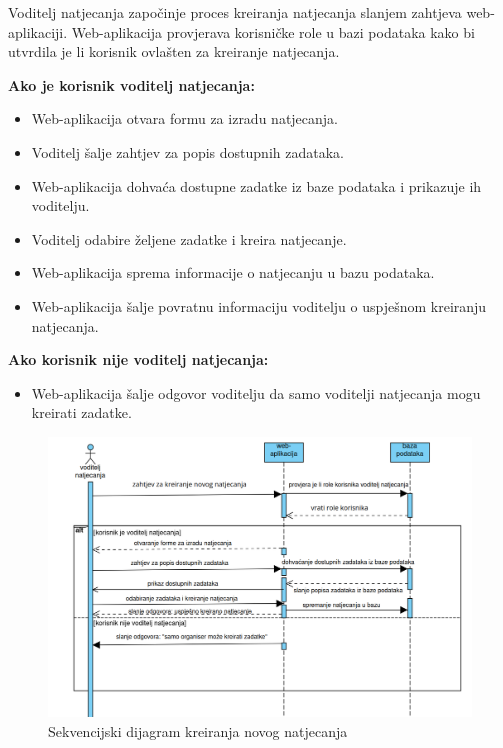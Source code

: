 \documentclass{article}
\begin{document}
Voditelj natjecanja započinje proces kreiranja natjecanja slanjem zahtjeva web-aplikaciji.
Web-aplikacija provjerava korisničke role u bazi podataka kako bi utvrdila je li korisnik ovlašten za kreiranje natjecanja.

\textbf{Ako je korisnik voditelj natjecanja:}
\begin{itemize}
  \item Web-aplikacija otvara formu za izradu natjecanja.
  \item Voditelj šalje zahtjev za popis dostupnih zadataka.
  \item Web-aplikacija dohvaća dostupne zadatke iz baze podataka i prikazuje ih voditelju.
  \item Voditelj odabire željene zadatke i kreira natjecanje.
  \item Web-aplikacija sprema informacije o natjecanju u bazu podataka.
  \item Web-aplikacija šalje povratnu informaciju voditelju o uspješnom kreiranju natjecanja.
\end{itemize}

\textbf{Ako korisnik nije voditelj natjecanja:}
\begin{itemize}
  \item Web-aplikacija šalje odgovor voditelju da samo voditelji natjecanja mogu kreirati zadatke.
\end{itemize}


\begin{figure}[h!]
  \centering
  \includegraphics[width=\linewidth]{../slike/kreiranje_natjecanja.png}
  \caption{Sekvencijski dijagram kreiranja novog natjecanja}\label{fig:seqdiag}
\end{figure}
\end{document}
